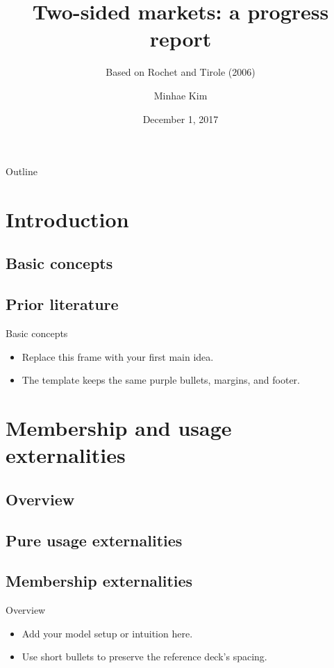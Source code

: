 \documentclass[aspectratio=43]{beamer}
\title[Two-sided markets]{Two-sided markets: a progress report}
\subtitle{Based on Rochet and Tirole (2006)}
\author[Minhae Kim\ (Ohio State)]{Minhae Kim}
\institute{The Ohio State University}
\date[December 1, 2017]{December 1, 2017}
\newcommand{\fulllineoutline}{%
  \begin{frame}{Outline}
    \tableofcontents
  \end{frame}
}
\begin{document}
\begin{frame}[plain]
  \titlepage
\end{frame}

\fulllineoutline

\section{Introduction}
\subsection{Basic concepts}
\subsection{Prior literature}

\begin{frame}{Basic concepts}
  \begin{itemize}
    \item Replace this frame with your first main idea.
    \item The template keeps the same purple bullets, margins, and footer.
  \end{itemize}
\end{frame}

\section{Membership and usage externalities}
\subsection{Overview}
\subsection{Pure usage externalities}
\subsection{Membership externalities}

\begin{frame}{Overview}
  \begin{itemize}
    \item Add your model setup or intuition here.
    \item Use short bullets to preserve the reference deck's spacing.
  \end{itemize}
\end{frame}
\end{document}
